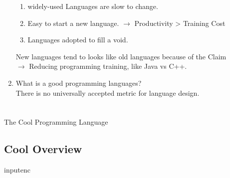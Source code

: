 \begin{enumerate}
        \begin{enumerate}
            \item widely-used Languages are slow to change.
            \item Easy to start a new language. \(\longrightarrow\) Productivity > Training Cost
            \item Languages adopted to fill a void.
        \end{enumerate}
        \begin{flushleft}
            New languages tend to looks like old languages because of the Claim\\
            \(\rightarrow\) Reducing programming training, like Java vs C++.
        \end{flushleft}
        \item What is a good programming languages?\\
        \textcolor{StanfordRed}{There is no universally accepted metric for language design. }
    \end{enumerate}

    \newpage
    \chapter{}{\textcolor{StanfordRed}{The Cool Programming Language}}
    \section{\textcolor{StanfordRed}{Cool Overview}}
    
inputenc